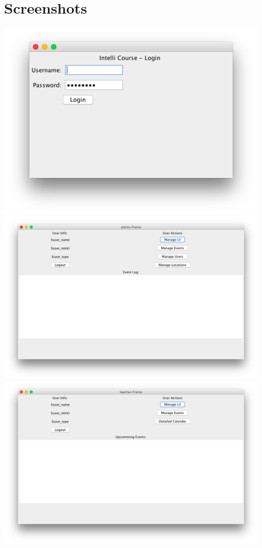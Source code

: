 \documentclass[a4paper,12pt]{article}
\begin{document}
\section*{Screenshots}
	\begin{center}
		\includegraphics[scale=.5]{Login.png}
		\includegraphics[scale=.4]{Admin.png}
		\includegraphics[scale=.4]{Teacher.png}

\end{center}
\end{document}

